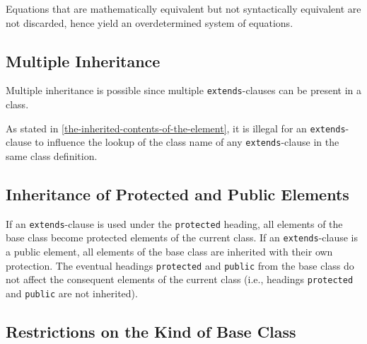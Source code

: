 \begin{nonnormative}
Equations that are mathematically equivalent but not syntactically equivalent are not discarded, hence yield an overdetermined system of equations.
\end{nonnormative}

\subsection{Multiple Inheritance}\label{multiple-inheritance}

Multiple inheritance is possible since multiple \lstinline!extends!-clauses can be present in a class.

\begin{nonnormative}
As stated in \cref{the-inherited-contents-of-the-element}, it is illegal for an \lstinline!extends!-clause to influence the lookup of the class name of any \lstinline!extends!-clause in the same class definition.
\end{nonnormative}

\subsection{Inheritance of Protected and Public Elements}\label{inheritance-of-protected-and-public-elements}

If an \lstinline!extends!-clause is used under the \lstinline!protected! heading, all elements of the base class become protected elements of the current class.
If an \lstinline!extends!-clause is a public element, all elements of the base class are inherited with their own protection.
The eventual headings \lstinline!protected! and \lstinline!public! from the base class do not affect the consequent elements of the current class (i.e., headings \lstinline!protected! and \lstinline!public! are not inherited).

\subsection{Restrictions on the Kind of Base Class}\label{restrictions-on-the-kind-of-base-class}

